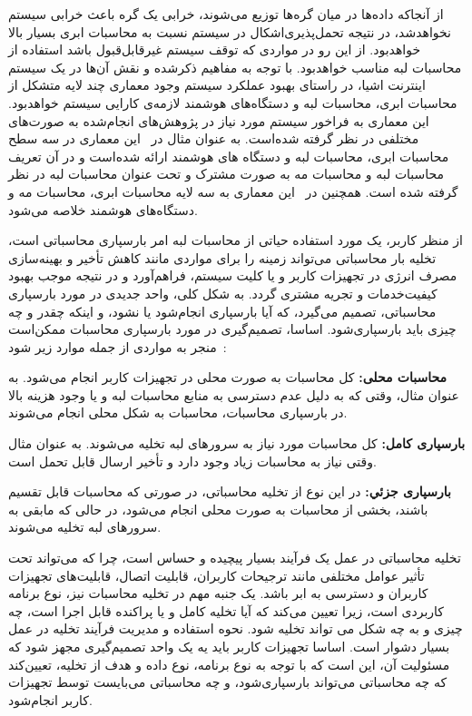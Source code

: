 از آنجاکه داده‌ها در میان گره‌ها توزیع می‌شوند، خرابی یک گره باعث خرابی سیستم نخواهد‌شد، در نتیجه تحمل‌پذیری‌اشکال‌  در سیستم نسبت به محاسبات ابری بسیار بالا خواهدبود. از این رو در مواردی که توقف سیستم غیرقابل‌قبول باشد استفاده از محاسبات لبه مناسب خواهدبود. با توجه به مفاهیم ذکرشده و نقش آن‌ها در یک سیستم اینترنت اشیا، در راستای بهبود عملکرد سیستم وجود معماری چند لایه متشکل از محاسبات ابری، محاسبات لبه و دستگاه‌های هوشمند لازمه‌ی کارایی سیستم خواهدبود. این معماری به فراخور سیستم مورد نیاز در پژوهش‌های انجام‌شده به صورت‌های مختلفی در نظر گرفته شده‌است. به عنوان مثال در~\cite{gai2018optimal} این معماری در سه سطح محاسبات ابری، محاسبات لبه و دستگاه های هوشمند ارائه شده‌است و در آن تعریف محاسبات لبه و محاسبات مه به صورت مشترک و تحت عنوان محاسبات لبه در نظر گرفته شده است. همچنین در~\cite{li2019energy} این معماری به سه لایه محاسبات ابری، محاسبات مه و دستگاه‌های هوشمند خلاصه می‌شود.


از منظر کاربر، یک مورد استفاده حیاتی از محاسبات لبه امر بارسپاری محاسباتی است، تخلیه بار محاسباتی می‌تواند زمینه را برای مواردی مانند کاهش تأخیر و بهینه‌سازی مصرف انرژی در تجهیزات کاربر و یا کلیت سیستم، فراهم‌آورد و در نتیجه موجب بهبود کیفیت‌خدمات و تجریه مشتری گردد. به شکل کلی، واحد جدیدی در مورد بارسپاری محاسباتی، تصمیم می‌گیرد، که آیا بارسپاری انجام‌شود یا نشود، و اینکه چقدر و چه چیزی باید بارسپاری‌شود. اساسا، تصمیم‌گیری در مورد بارسپاری محاسبات ممکن‌است منجر به مواردی از جمله موارد زیر شود~\cite{mach2017mobile}:




 \textbf{محاسبات محلی:}
کل محاسبات به صورت محلی در تجهیزات کاربر انجام می‌شود. به عنوان مثال، وقتی که به دلیل عدم دسترسی به منابع محاسبات لبه  و یا وجود هزینه بالا در بارسپاری محاسبات، محاسبات به شکل محلی انجام می‌شوند.


  \textbf{بارسپاری کامل:}
کل محاسبات مورد نیاز به سرورهای لبه تخلیه می‌شوند. به عنوان مثال وقتی نیاز به محاسبات زیاد وجود دارد و تأخیر ارسال قابل تحمل است. 


 \textbf{‌بارسپاری جزئي:} 
در این نوع از تخلیه محاسباتی، در صورتی که محاسبات قابل تقسیم باشند، بخشی از محاسبات به صورت محلی انجام می‌شود، در حالی که مابقی به سرورهای لبه تخلیه می‌شوند. 



تخلیه محاسباتی در عمل یک فرآیند بسیار پیچیده و حساس است، چرا که می‌تواند تحت تأثیر عوامل مختلفی مانند ترجیحات کاربران، قابلیت اتصال، قابلیت‌های تجهیزات کاربران و دسترسی به ابر باشد. یک جنبه مهم در تخلیه محاسبات نیز، نوع برنامه کاربردی است، زیرا تعیین می‌کند که آیا تخلیه کامل و یا پراکنده قابل اجرا است، چه چیزی و به چه شکل می تواند تخلیه شود. نحوه استفاده و مدیریت فرآیند تخلیه در عمل بسیار دشوار است. اساسا تجهیزات کاربر باید یه یک واحد تصمیم‌گیری مجهز شود که مسئولیت آن، این است که با توجه به نوع برنامه، نوع داده و هدف از تخلیه، تعیین‌کند که چه محاسباتی می‌تواند بارسپاری‌شود، و چه محاسباتی می‌بایست توسط تجهیزات کاربر انجام‌شود.


